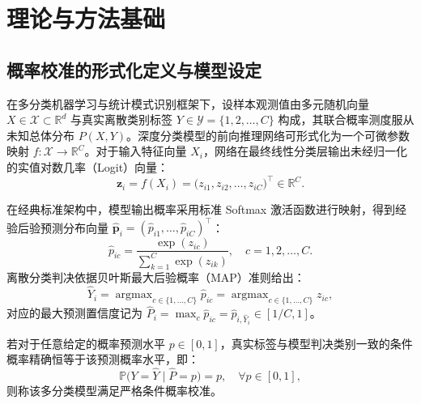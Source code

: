 \section{理论与方法基础}\label{sec:theory}

\subsection{概率校准的形式化定义与模型设定}

在多分类机器学习与统计模式识别框架下，设样本观测值由多元随机向量 $X \in \mathcal{X} \subset \mathbb{R}^d$ 与真实离散类别标签 $Y \in \mathcal{Y} = \{1, 2, \dots, C\}$ 构成，其联合概率测度服从未知总体分布 $P(X, Y)$。深度分类模型的前向推理网络可形式化为一个可微参数映射 $f: \mathcal{X} \to \mathbb{R}^C$。对于输入特征向量 $X_i$，网络在最终线性分类层输出未经归一化的实值对数几率（Logit）向量：
\begin{equation}\label{eq:logit_vector}
\boldsymbol{z}_i = f(X_i) = \big(z_{i1}, z_{i2}, \dots, z_{iC}\big)^\top \in \mathbb{R}^C.
\end{equation}

在经典标准架构中，模型输出概率采用标准 Softmax 激活函数进行映射，得到经验后验预测分布向量 $\hat{\boldsymbol{p}}_i = (\hat p_{i1}, \dots, \hat p_{iC})^\top$：
\begin{equation}\label{eq:standard_softmax}
\hat p_{ic} = \frac{\exp(z_{ic})}{\sum_{k=1}^C \exp(z_{ik})}, \quad c = 1, 2, \dots, C.
\end{equation}
离散分类判决依据贝叶斯最大后验概率（MAP）准则给出：
\begin{equation}\label{eq:map_decision}
\hat Y_i = \operatorname{argmax}_{c \in \{1,\dots,C\}} \hat p_{ic} = \operatorname{argmax}_{c \in \{1,\dots,C\}} z_{ic},
\end{equation}
对应的最大预测置信度记为 $\hat P_i = \max_{c} \hat p_{ic} = \hat p_{i, \hat Y_i} \in [1/C, 1]$。

\begin{defn}[条件概率校准性]\label{defn:calibration}
若对于任意给定的概率预测水平 $p \in [0, 1]$，真实标签与模型判决类别一致的条件概率精确恒等于该预测概率水平，即：
\begin{equation}\label{eq:calibration_formal}
\mathbb{P}\big(Y = \hat Y \;\big|\; \hat P = p\big) = p, \quad \forall p \in [0, 1],
\end{equation}
则称该多分类模型满足严格条件概率校准。
\end{defn}

